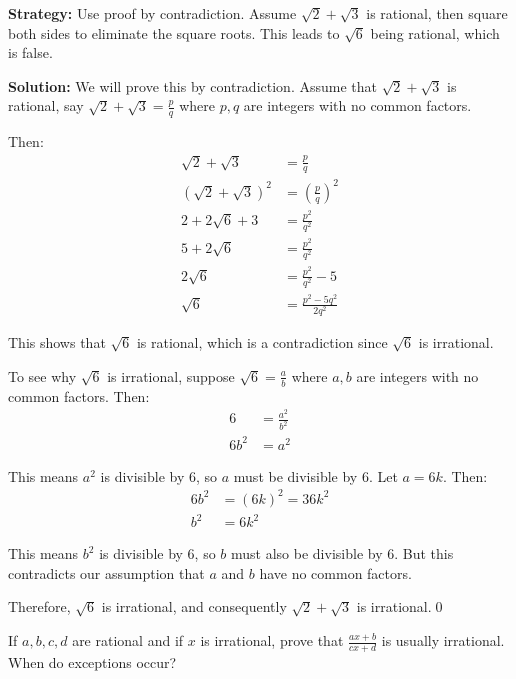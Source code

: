 \noindent\textbf{Strategy:} Use proof by contradiction. Assume $\sqrt{2} + \sqrt{3}$ is rational, then square both sides to eliminate the square roots. This leads to $\sqrt{6}$ being rational, which is false.

\bigskip\noindent\textbf{Solution:}
We will prove this by contradiction. Assume that $\sqrt{2} + \sqrt{3}$ is rational, say $\sqrt{2} + \sqrt{3} = \frac{p}{q}$ where $p, q$ are integers with no common factors.

Then:
\begin{align*}
\sqrt{2} + \sqrt{3} &= \frac{p}{q} \\
(\sqrt{2} + \sqrt{3})^2 &= \left(\frac{p}{q}\right)^2 \\
2 + 2\sqrt{6} + 3 &= \frac{p^2}{q^2} \\
5 + 2\sqrt{6} &= \frac{p^2}{q^2} \\
2\sqrt{6} &= \frac{p^2}{q^2} - 5 \\
\sqrt{6} &= \frac{p^2 - 5q^2}{2q^2}
\end{align*}

This shows that $\sqrt{6}$ is rational, which is a contradiction since $\sqrt{6}$ is irrational.

To see why $\sqrt{6}$ is irrational, suppose $\sqrt{6} = \frac{a}{b}$ where $a, b$ are integers with no common factors. Then:
\begin{align*}
6 &= \frac{a^2}{b^2} \\
6b^2 &= a^2
\end{align*}

This means $a^2$ is divisible by 6, so $a$ must be divisible by 6. Let $a = 6k$. Then:
\begin{align*}
6b^2 &= (6k)^2 = 36k^2 \\
b^2 &= 6k^2
\end{align*}

This means $b^2$ is divisible by 6, so $b$ must also be divisible by 6. But this contradicts our assumption that $a$ and $b$ have no common factors.

Therefore, $\sqrt{6}$ is irrational, and consequently $\sqrt{2} + \sqrt{3}$ is irrational.\qed


\begin{problembox}
\begin{problemstatement}
If $a, b, c, d$ are rational and if $x$ is irrational, prove that $\frac{ax + b}{cx + d}$ is usually irrational. When do exceptions occur?
\end{problemstatement}
\end{problembox}

